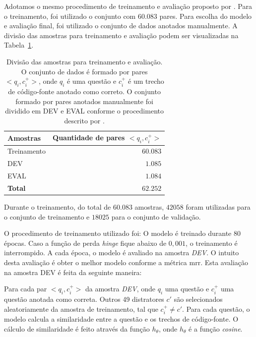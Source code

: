 Adotamos o mesmo procedimento de treinamento e avaliação proposto por \cite{iyer-etal-2016-summarizing}. Para o treinamento, foi utilizado o conjunto com $60.083$ pares. Para escolha do modelo e avaliação final, foi utilizado o conjunto de dados anotados manualmente. A divisão das amostras para treinamento e avaliação podem ser visualizadas na Tabela~\ref{table:divisao-amostras}. 

\begin{table}[h]
\centering
\begin{tabular}{ p{3cm} r  }
 \hline
 \textbf{Amostras} & \textbf{Quantidade de pares $<q_{i}, c_{i}^{+}>$}\\
 \hline
 Treinamento & $60.083$\\
 
 DEV & $1.085$ \\
 
 EVAL & $1.084$\\
 \hline
 \textbf{Total} & $\bm{62.252}$\\
 \hline
\end{tabular}
\caption{Divisão das amostras para treinamento e avaliação. O conjunto de dados é formado por pares $<q_{i}, c_{i}^{+}>$, onde $q_{i}$ é uma questão e $c_{i}^{+}$ é um trecho de código-fonte anotado como correto. O conjunto formado por pares anotados manualmente foi dividido em DEV e EVAL conforme o procedimento descrito por \cite{iyer-etal-2016-summarizing}.}
\label{table:divisao-amostras}
\end{table}

Durante o treinamento, do total de $60.083$ amostras, $42058$ foram utilizadas para o conjunto de treinamento e $18025$ para o conjunto de validação.

O procedimento de treinamento utilizado foi: O modelo é treinado durante 80 épocas. Caso a função de perda \textit{hinge} fique abaixo de $0,001$, o treinamento é interrompido. A cada época, o modelo é avaliado na amostra \emph{DEV}. O intuito desta avaliação é obter o melhor modelo conforme a métrica \acrshort{mrr}. Esta avaliação na amostra DEV é feita da seguinte maneira:

Para cada par $<q_{i}, c_{i}^{+}>$ da amostra \emph{DEV}, onde $q_{i}$ uma questão e $c_{i}^{+}$ uma questão anotada como correta. Outros 49 distratores $c'$ são selecionados aleatoriamente da amostra de treinamento, tal que $c_{i}^{+} \neq c'$. Para cada questão, o modelo calcula a similaridade entre a questão e os trechos de código-fonte. O cálculo de similaridade é feito através da função $h_{\theta}$, onde $h_{\theta}$ é a função \textit{cosine}. 


